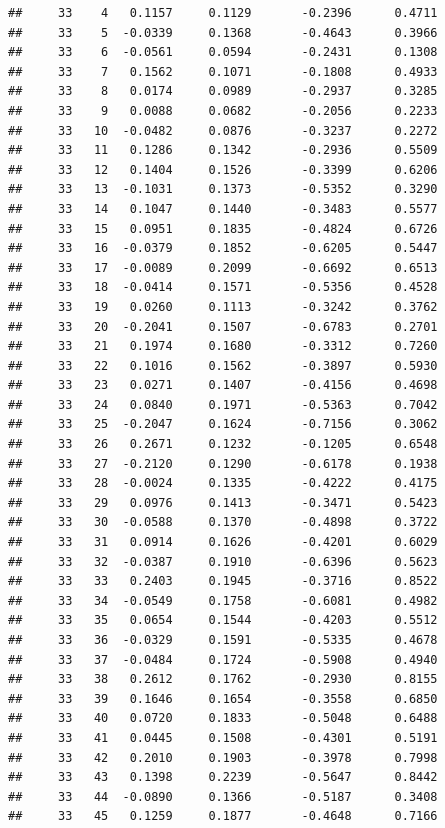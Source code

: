 \documentclass[
]{article}
\begin{document}
\begin{verbatim}
##     33    4   0.1157     0.1129       -0.2396      0.4711  
##     33    5  -0.0339     0.1368       -0.4643      0.3966  
##     33    6  -0.0561     0.0594       -0.2431      0.1308  
##     33    7   0.1562     0.1071       -0.1808      0.4933  
##     33    8   0.0174     0.0989       -0.2937      0.3285  
##     33    9   0.0088     0.0682       -0.2056      0.2233  
##     33   10  -0.0482     0.0876       -0.3237      0.2272  
##     33   11   0.1286     0.1342       -0.2936      0.5509  
##     33   12   0.1404     0.1526       -0.3399      0.6206  
##     33   13  -0.1031     0.1373       -0.5352      0.3290  
##     33   14   0.1047     0.1440       -0.3483      0.5577  
##     33   15   0.0951     0.1835       -0.4824      0.6726  
##     33   16  -0.0379     0.1852       -0.6205      0.5447  
##     33   17  -0.0089     0.2099       -0.6692      0.6513  
##     33   18  -0.0414     0.1571       -0.5356      0.4528  
##     33   19   0.0260     0.1113       -0.3242      0.3762  
##     33   20  -0.2041     0.1507       -0.6783      0.2701  
##     33   21   0.1974     0.1680       -0.3312      0.7260  
##     33   22   0.1016     0.1562       -0.3897      0.5930  
##     33   23   0.0271     0.1407       -0.4156      0.4698  
##     33   24   0.0840     0.1971       -0.5363      0.7042  
##     33   25  -0.2047     0.1624       -0.7156      0.3062  
##     33   26   0.2671     0.1232       -0.1205      0.6548  
##     33   27  -0.2120     0.1290       -0.6178      0.1938  
##     33   28  -0.0024     0.1335       -0.4222      0.4175  
##     33   29   0.0976     0.1413       -0.3471      0.5423  
##     33   30  -0.0588     0.1370       -0.4898      0.3722  
##     33   31   0.0914     0.1626       -0.4201      0.6029  
##     33   32  -0.0387     0.1910       -0.6396      0.5623  
##     33   33   0.2403     0.1945       -0.3716      0.8522  
##     33   34  -0.0549     0.1758       -0.6081      0.4982  
##     33   35   0.0654     0.1544       -0.4203      0.5512  
##     33   36  -0.0329     0.1591       -0.5335      0.4678  
##     33   37  -0.0484     0.1724       -0.5908      0.4940  
##     33   38   0.2612     0.1762       -0.2930      0.8155  
##     33   39   0.1646     0.1654       -0.3558      0.6850  
##     33   40   0.0720     0.1833       -0.5048      0.6488  
##     33   41   0.0445     0.1508       -0.4301      0.5191  
##     33   42   0.2010     0.1903       -0.3978      0.7998  
##     33   43   0.1398     0.2239       -0.5647      0.8442  
##     33   44  -0.0890     0.1366       -0.5187      0.3408  
##     33   45   0.1259     0.1877       -0.4648      0.7166  

\end{verbatim}
\end{document}
